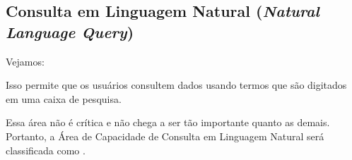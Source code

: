 \subsection{Consulta em Linguagem Natural (\emph{Natural Language Query})}
\label{sub-nlq}

Vejamos:

\begin{definition}
 Isso permite que os usuários consultem dados usando termos que são digitados em uma caixa de pesquisa.
 \end{definition}
 

Essa área não é crítica e não chega a ser tão importante quanto as demais. Portanto, a Área de Capacidade de Consulta em Linguagem Natural será classificada como \WOULD.
 